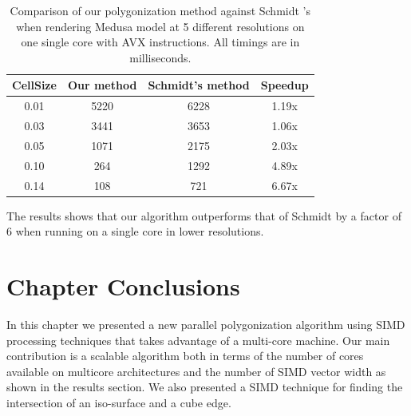 \begin{table}[H]
\begin{center}
	 \caption{\label{table:stats}
  {Comparison of our polygonization method against Schmidt \etal's \cite{SWG2005} 
  when rendering Medusa model at 5 different resolutions on one single core with AVX instructions. 
  All timings are in milliseconds.}
}
  \begin{tabular}{ | c | c | c | c |}
    \hline    
    CellSize & Our method & Schmidt's method & Speedup \\ \hline \hline
    0.01 & 5220 & 6228 & 1.19x\\ \hline
    0.03 & 3441 & 3653 & 1.06x \\ \hline
    0.05 & 1071 & 2175 & 2.03x	 \\ \hline
    0.10 & 264 & 1292 &	4.89x \\ \hline    
    0.14 & 108 & 721 & 6.67x \\        
    \hline
  	\end{tabular}
\end{center}
\end{table}


The results shows that our algorithm outperforms that of Schmidt \etal by a factor of 6 when running on a single core in lower resolutions. 



\section{Chapter Conclusions}\label{sec:futurework}
In this chapter we presented a new parallel polygonization algorithm using SIMD processing techniques that takes advantage of 
a multi-core machine. Our main contribution is a scalable algorithm both in terms of the number of cores available on 
multicore architectures and the number of SIMD vector width as shown in the results section.  We also presented a SIMD technique for 
finding the intersection of an iso-surface and a cube edge.

